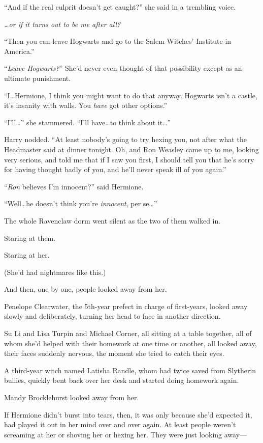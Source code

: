 “And if the real culprit doesn’t get caught?” she said in a trembling voice.

\emph{…or if it turns out to be me after all?}

“Then you can leave Hogwarts and go to the Salem Witches’ Institute in America.”

“\emph{Leave Hogwarts?}” She’d never even thought of that possibility except as an ultimate punishment.

“I…Hermione, I think you might want to do that anyway. Hogwarts isn’t a castle, it’s insanity with walls. You \emph{have} got other options.”

“I’ll…” she stammered. “I’ll have…to think about it…”

Harry nodded. “At least nobody’s going to try hexing you, not after what the Headmaster said at dinner tonight. Oh, and Ron Weasley came up to me, looking very serious, and told me that if I saw you first, I should tell you that he’s sorry for having thought badly of you, and he’ll never speak ill of you again.”

“\emph{Ron} believes I’m innocent?” said Hermione.

“Well…he doesn’t think you’re \emph{innocent}, per se…”

\later

The whole Ravenclaw dorm went silent as the two of them walked in.

Staring at them.

Staring at her.

(She’d had nightmares like this.)

And then, one by one, people looked away from her.

Penelope Clearwater, the 5th-year prefect in charge of first-years, looked away slowly and deliberately, turning her head to face in another direction.

Su Li and Lisa Turpin and Michael Corner, all sitting at a table together, all of whom she’d helped with their homework at one time or another, all looked away, their faces suddenly nervous, the moment she tried to catch their eyes.

A third-year witch named Latisha Randle, whom \SPHEW{} had twice saved from Slytherin bullies, quickly bent back over her desk and started doing homework again.

Mandy Brocklehurst looked away from her.

If Hermione didn’t burst into tears, then, it was only because she’d expected it, had played it out in her mind over and over again. At least people weren’t screaming at her or shoving her or hexing her. They were just looking away—

